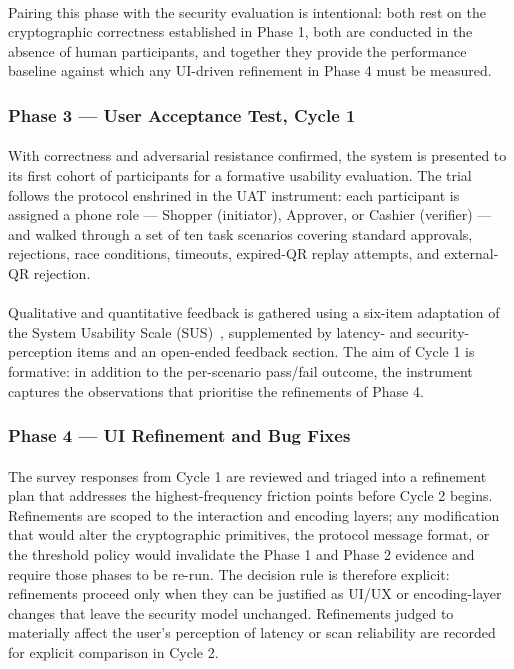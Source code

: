 \documentclass[a4paper]{scl-article}
\begin{document}
\paragraph{}Pairing this phase with the security evaluation is intentional: both rest on the cryptographic correctness established in Phase 1, both are conducted in the absence of human participants, and together they provide the performance baseline against which any UI-driven refinement in Phase 4 must be measured.

\subsubsection{Phase 3 --- User Acceptance Test, Cycle 1}
\label{sect:meth4_uat1}
\paragraph{}With correctness and adversarial resistance confirmed, the system is presented to its first cohort of participants for a formative usability evaluation. The trial follows the protocol enshrined in the UAT instrument: each participant is assigned a phone role --- Shopper (initiator), Approver, or Cashier (verifier) --- and walked through a set of ten task scenarios covering standard approvals, rejections, race conditions, timeouts, expired-QR replay attempts, and external-QR rejection.
\paragraph{}Qualitative and quantitative feedback is gathered using a six-item adaptation of the System Usability Scale (SUS)~\cite{brooke1996sus, bangor2008sus}, supplemented by latency- and security-perception items and an open-ended feedback section. The aim of Cycle 1 is formative: in addition to the per-scenario pass/fail outcome, the instrument captures the observations that prioritise the refinements of Phase 4.

\subsubsection{Phase 4 --- UI Refinement and Bug Fixes}
\label{sect:meth4_refine}
\paragraph{}The survey responses from Cycle 1 are reviewed and triaged into a refinement plan that addresses the highest-frequency friction points before Cycle 2 begins. Refinements are scoped to the interaction and encoding layers; any modification that would alter the cryptographic primitives, the protocol message format, or the threshold policy would invalidate the Phase 1 and Phase 2 evidence and require those phases to be re-run. The decision rule is therefore explicit: refinements proceed only when they can be justified as UI/UX or encoding-layer changes that leave the security model unchanged. Refinements judged to materially affect the user's perception of latency or scan reliability are recorded for explicit comparison in Cycle 2.
\end{document}
